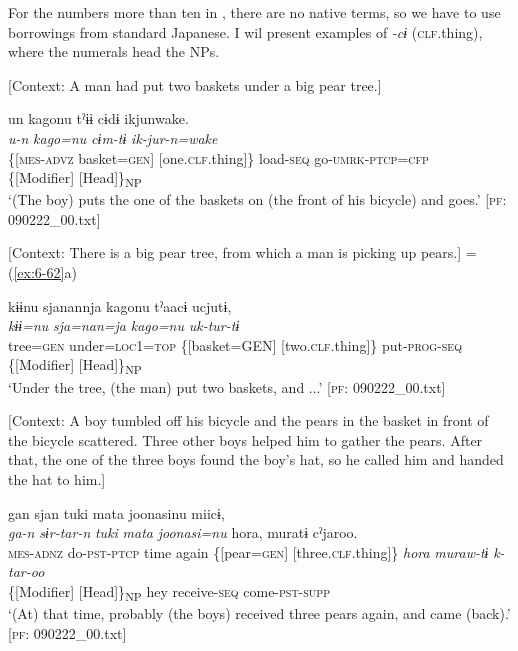 For the numbers more than ten in , there are no native terms, so we have to use borrowings from standard Japanese. I wil present examples of \textit{{}-cɨ} (\textsc{clf}.thing), where the numerals head the NPs.

\ea \label{ex:7:12}
\ea \label{ex:7:12a} [Context: A man had put two baskets under a big pear tree.]

{\TM}
\gllll  un  kagonu  tˀɨɨ  cɨdɨ   ikjunwake.\\
\textit{u-n}  \textit{kago=nu}  \textit{}  \textit{cɨm-tɨ} \textit{ik-jur-n=wake}\\
\{[\textsc{mes}-\textsc{advz}  basket=\textsc{gen}]  [one.\textsc{clf}.thing]\}  load-\textsc{seq}          go-\textsc{umrk}-\textsc{ptcp}=\textsc{cfp}\\
\{[Modifier]    [Head]\}\textsubscript{NP}  \\
\glt ‘(The boy) puts the one of the baskets on (the front of his bicycle) and goes.’ [\textsc{pf}: 090222\_00.txt]

\ex \label{ex:7:12b}[Context: There is a big pear tree, from which a man is picking up pears.] = (\ref{ex:6-62}a)

  {\TM}
\glll kɨɨnu  sjanannja  kagonu  tˀaacɨ  ucjutɨ,\\
\textit{kɨɨ=nu}  \textit{sja=nan=ja}  \textit{kago=nu}  \textit{}  \textit{uk-tur-tɨ}\\
      tree=\textsc{gen}  under=\textsc{loc}1=\textsc{top}  \{[basket=GEN]  [two.\textsc{clf}.thing]\}   put-\textsc{prog}-\textsc{seq}\\
          \{[Modifier]  [Head]\}\textsubscript{NP}\\
\glt    ‘Under the tree, (the man) put two baskets, and ...’      [\textsc{pf}: 090222\_00.txt]

\ex \label{ex:7:12c}[Context: A boy tumbled off his bicycle and the pears in the basket in front of the bicycle scattered. Three other boys helped him to gather the pears. After that, the one of the three boys found the boy’s hat, so he called him and handed the hat to him.]

{\TM}
\glll gan  sjan  tuki  mata  joonasinu  miicɨ,\\
\textit{ga-n}  \textit{sɨr-tar-n}  \textit{tuki}  \textit{mata}  \textit{joonasi=nu}  \textit{} {\textbar}hora{\textbar},  muratɨ  cˀjaroo.\\
      \textsc{mes}-\textsc{adnz}  do-\textsc{pst}-\textsc{ptcp}  time  again  \{[pear=\textsc{gen}]  [three.\textsc{clf}.thing]\}    \textit{hora}  \textit{muraw-tɨ}  \textit{k-tar-oo}\\
              \{[Modifier]  [Head]\}\textsubscript{NP}    hey  receive-\textsc{seq}  come-\textsc{pst}-\textsc{supp}\\
\glt    ‘(At) that time, probably (the boys) received three pears again, and came (back).’      [\textsc{pf}: 090222\_00.txt]

